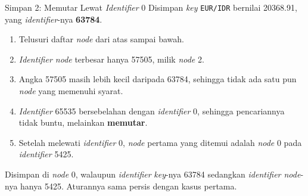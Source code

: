 \documentclass[aspectratio=169, table, 12pt]{beamer}
\begin{document}
\begin{frame}{{\Large Simpan 2: Memutar Lewat \textit{Identifier} 0}}
  \vspace{10pt}
  {\small Disimpan \textit{key} \texttt{EUR/IDR} bernilai 20368.91, yang \textit{identifier}-nya
  \textbf{63784}.}
  \vspace{6pt}
  \begin{enumerate}\small
    \item Telusuri daftar \textit{node} dari atas sampai bawah.
    \item \textit{Identifier node} terbesar hanya 57505, milik \textit{node} 2.
    \item Angka 57505 masih lebih kecil daripada 63784, sehingga tidak ada satu
          pun \textit{node} yang memenuhi syarat.
    \item \textit{Identifier} 65535 bersebelahan dengan \textit{identifier} 0, sehingga pencariannya tidak
          buntu, melainkan \textbf{memutar}.
    \item Setelah melewati \textit{identifier} 0, \textit{node} pertama yang ditemui adalah
          \textit{node} 0 pada \textit{identifier} 5425.
  \end{enumerate}

  \vspace{6pt}
  {\small Disimpan di \textit{node} 0, walaupun \textit{identifier} \textit{key}-nya 63784 sedangkan
  \textit{identifier node}-nya hanya 5425. Aturannya sama persis dengan kasus
  pertama.}
\end{frame}
\end{document}
